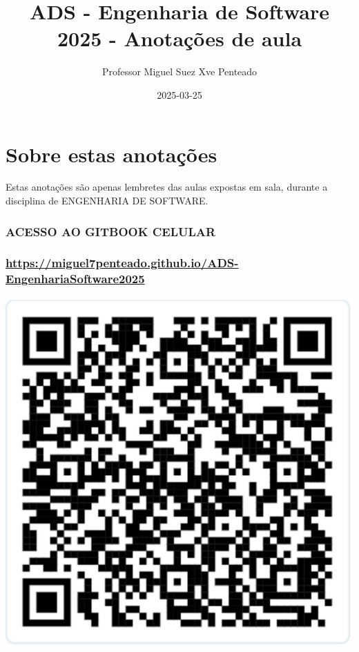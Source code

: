 \documentclass[
]{book}
\title{ADS - Engenharia de Software 2025 - Anotações de aula}
\author{Professor Miguel Suez Xve Penteado}
\date{2025-03-25}
\begin{document}
\maketitle

{
\setcounter{tocdepth}{1}
\tableofcontents
}
\chapter*{Sobre estas anotações}\label{sobre-estas-anotauxe7uxf5es}

Estas anotações são apenas lembretes das aulas expostas em sala, durante a disciplina de ENGENHARIA DE SOFTWARE.

\subsection{ACESSO AO GITBOOK CELULAR}\label{acesso-ao-gitbook-celular}

\subsection{\texorpdfstring{\url{https://miguel7penteado.github.io/ADS-EngenhariaSoftware2025}}{https://miguel7penteado.github.io/ADS-EngenhariaSoftware2025}}\label{httpsmiguel7penteado.github.ioads-engenhariasoftware2025}

\includegraphics{images/qr-code-disciplina.jpg}
\end{document}
